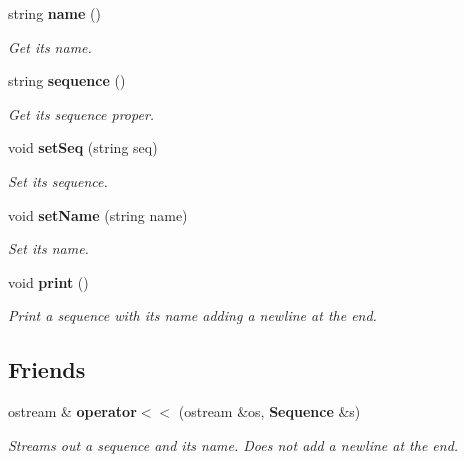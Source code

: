 \begin{CompactItemize}
\item 
string {\bf name} ()\label{classSequence_a6}

\begin{CompactList}\small\item\em Get its name. \item\end{CompactList}\item 
string {\bf sequence} ()\label{classSequence_a7}

\begin{CompactList}\small\item\em Get its sequence proper. \item\end{CompactList}\item 
void {\bf set\-Seq} (string seq)\label{classSequence_a8}

\begin{CompactList}\small\item\em Set its sequence. \item\end{CompactList}\item 
void {\bf set\-Name} (string name)\label{classSequence_a9}

\begin{CompactList}\small\item\em Set its name. \item\end{CompactList}\item 
void {\bf print} ()\label{classSequence_a10}

\begin{CompactList}\small\item\em Print a sequence with its name adding a newline at the end. \item\end{CompactList}\end{CompactItemize}
\subsection*{Friends}
\begin{CompactItemize}
\item 
ostream \& {\bf operator$<$$<$} (ostream \&os, {\bf Sequence} \&s)\label{classSequence_n0}

\begin{CompactList}\small\item\em Streams out a sequence and its name. Does not add a newline at the end. \item\end{CompactList}\end{CompactItemize}


